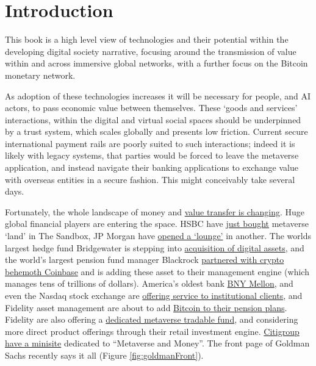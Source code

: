 \documentclass[
	10pt, %
	fleqn, %
	a5paper, %
]{LegrandOrangeBook}
\begin{document}
\section{Introduction}
This book is a high level view of technologies and their potential within the developing digital society narrative, focusing around the transmission of value within and across immersive global networks, with a further focus on the Bitcoin monetary network.\par
As adoption of these technologies increases it will be necessary for people, and AI actors, to pass economic value between themselves. These `goods and services' interactions, within the digital and virtual social spaces should be underpinned by a trust system, which scales globally and presents low friction. Current secure international payment rails are poorly suited to such interactions; indeed it is likely with legacy systems, that parties would be forced to leave the metaverse application, and instead navigate their banking applications to exchange value with overseas entities in a secure fashion. This might conceivably take several days.\par 
Fortunately, the whole landscape of money and \href{https://www.omfif.org/futureofpayments2021/}{value transfer is changing}. Huge global financial players are entering the space. HSBC have \href{https://sandboxgame.medium.com/hsbc-to-become-the-first-global-financial-services-provider-to-enter-the-sandbox-c066e4f48163}{just bought} metaverse `land' in The Sandbox, JP Morgan have \href{https://www.forbes.com/sites/ronshevlin/2022/02/16/jpmorgan-opens-a-bank-branch-in-the-metaverse-but-its-not-for-what-you-think-its-for/?sh=2fbd1e90158d}{opened a `lounge'} in another. The worlds largest hedge fund Bridgewater is stepping into \href{https://uk.finance.yahoo.com/news/bitcoin-latest-price-crypto-ray-dalio-bridgewater-investment-fund-ethereum-094946686.html}{acquisition of digital assets}, and the world's largest pension fund manager Blackrock \href{https://blog.coinbase.com/coinbase-selected-by-blackrock-provide-aladdin-clients-access-to-crypto-trading-and-custody-via-b9e7144f313d}{partnered with crypto behemoth Coinbase} and is adding these asset to their management engine (which manages tens of trillions of dollars). America's oldest bank \href{https://www.bnymellon.com/emea/en/about-us/newsroom/press-release/bny-mellon-launches-new-digital-asset-custody-platform-130305.html}{BNY Mellon}, and even the Nasdaq stock exchange are \href{https://www.nasdaq.com/articles/nasdaq-to-launch-institutional-bitcoin-crypto-custody-services\%3A-report}{offering service to institutional clients}, and Fidelity asset management are about to add \href{https://www.wsj.com/articles/fidelity-weighs-bitcoin-trading-on-brokerage-platform-11663008698}{Bitcoin to their pension plans}. Fidelity are also offering a \href{}{dedicated metaverse tradable fund}, and considering more direct product offerings through their retail investment engine. \href{https://www.citivelocity.com/citigps/metaverse-and-money/}{Citigroup have a minisite} dedicated to ``Metaverse and Money''. The front page of Goldman Sachs recently says it all (Figure \ref{fig:goldmanFront}).\par
\end{document}
